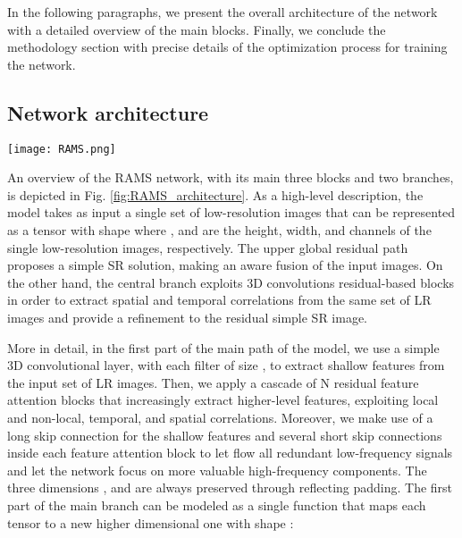 \documentclass[journal]{IEEEtran}
\begin{document}
In the following paragraphs, we present the overall architecture of the network with a detailed overview of the main blocks. Finally, we conclude the methodology section with precise details of the optimization process for training the network. 

\subsection{Network architecture}
\begin{figure*}[h]
\centering
\texttt{[image: RAMS.png]}
\caption{Overview of the Residual Attention Multi-image Super-resolution Network (RAMS), assuming to work with single-channel LR images () to simplify the discussion. A tensor of  single-channel LR images constitutes the input of the proposed model. The main branch extracts features, with 3D convolutions, in a hierarchical fashion, while a feature attention mechanism allows the network to select and focus on most promising inner representations. Concurrently, a global residual path exploits a similar attention operation in order to make an aware fusion of the  distinct LR images. All computations are efficiently performed in the LR feature space and only at the last stage of the model an upsampling operation is performed in both branches.}
\label{fig:RAMS_architecture}
\end{figure*}
An overview of the RAMS network, with its main three blocks and two branches, is depicted in Fig. \ref{fig:RAMS_architecture}. As a high-level description, the model takes as input a single set of  low-resolution images  that can be represented as a tensor  with shape  where ,  and  are the height, width, and channels of the single low-resolution images, respectively. The upper global residual path proposes a simple SR solution, making an aware fusion of the  input images. On the other hand, the central branch exploits 3D convolutions residual-based blocks in order to extract spatial and temporal correlations from the same set of  LR images and provide a refinement to the residual simple SR image.

More in detail, in the first part of the main path of the model, we use a simple 3D convolutional layer, with each filter of size , to extract  shallow features from the input set  of LR images. Then, we apply a cascade of N residual feature attention blocks that increasingly extract higher-level features, exploiting local and non-local, temporal, and spatial correlations. Moreover, we make use of a long skip connection for the shallow features and several short skip connections inside each feature attention block to let flow all redundant low-frequency signals and let the network focus on more valuable high-frequency components. The three dimensions ,  and  are always preserved through reflecting padding. The first part of the main branch can be modeled as a single function  that maps each tensor  to a new higher dimensional one  with shape :
\end{document}
